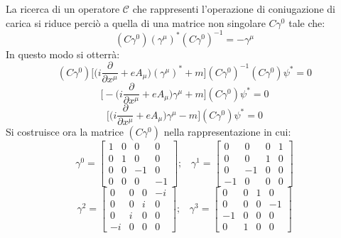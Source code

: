 La ricerca di un operatore $\mathscr{C}$ che rappresenti l'operazione di coniugazione di carica si riduce perciò a quella di una matrice non singolare $C\gamma^0$ tale che:
\begin{equation} \label{mat}
 (C\gamma^0)(\gamma^\mu)^*(C\gamma^0)^{-1} = -\gamma^\mu
\end{equation}
In questo modo si otterrà:
\begin{equation}
 (C\gamma^0)\Bigg[\Bigg(i\frac{\partial}{\partial x^\mu} +eA_\mu\Bigg)(\gamma^\mu)^* + m \Bigg] (C\gamma^0)^{-1}(C\gamma^0)\psi^* = 0
\end{equation}
\begin{equation}
  \Bigg[-\Bigg(i\frac{\partial}{\partial x^\mu} +eA_\mu\Bigg)\gamma^\mu + m \Bigg](C\gamma^0)\psi^* = 0
\end{equation}
\begin{equation}
  \Bigg[\Bigg(i\frac{\partial}{\partial x^\mu} + eA_\mu\Bigg)\gamma^\mu - m \Bigg](C\gamma^0)\psi^* = 0
\end{equation}
Si costruisce ora la matrice $(C\gamma^0)$ nella rappresentazione in cui:
\begin{equation}
 \gamma^0 = \begin{bmatrix} 1 & 0 & 0 & 0 \\ 0 & 1 & 0 & 0 \\ 0 & 0 & -1 & 0 \\ 0 & 0 & 0 & -1 \end{bmatrix}; \; \; \; \gamma^1 = \begin{bmatrix}   0 & 0 & 0 & 1\\  0 & 0 & 1 & 0  \\0 & -1 & 0 & 0\\-1 & 0 & 0 & 0 \end{bmatrix}
\end{equation}
\begin{equation}
 \gamma^2 = \begin{bmatrix} 0 & 0 & 0 & -i\\  0 & 0 & i & 0  \\0 & i & 0 & 0\\-i & 0 & 0 & 0 \end{bmatrix}; \; \; \; \gamma^3 = \begin{bmatrix}   0 & 0 & 1 & 0\\ 0 & 0 & 0 & -1 \\ -1 & 0 & 0 & 0 \\ 0 & 1 & 0 & 0 \end{bmatrix}
\end{equation}

